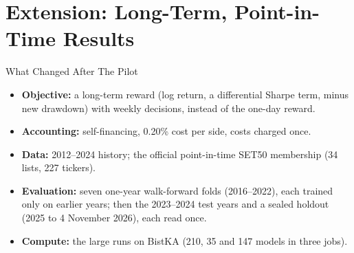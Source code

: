 
\section{Extension: Long-Term, Point-in-Time Results}

\begin{frame}{What Changed After The Pilot}
\begin{itemize}
  \item \textbf{Objective:} a long-term reward (log return, a differential Sharpe term, minus new drawdown) with weekly decisions, instead of the one-day reward.
  \item \textbf{Accounting:} self-financing, 0.20\% cost per side, costs charged once.
  \item \textbf{Data:} 2012--2024 history; the official point-in-time SET50 membership (34 lists, 227 tickers).
  \item \textbf{Evaluation:} seven one-year walk-forward folds (2016--2022), each trained only on earlier years; then the 2023--2024 test years and a sealed holdout (2025 to 4 November 2026), each read once.
  \item \textbf{Compute:} the large runs on BistKA (210, 35 and 147 models in three jobs).
\end{itemize}
\end{frame}

